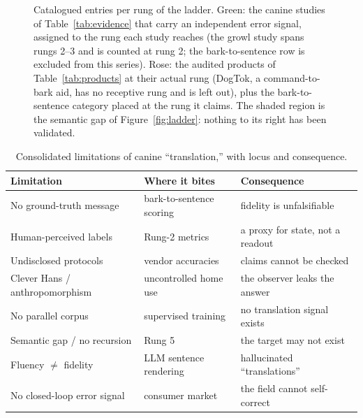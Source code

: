 \begin{figure}[htbp]
\centering
\resizebox{0.94\textwidth}{!}{}
\caption{Catalogued entries per rung of the ladder. Green: the canine studies
of Table~\ref{tab:evidence} that carry an independent error signal, assigned
to the rung each study reaches (the growl study spans rungs 2--3 and is
counted at rung 2; the bark-to-sentence row is excluded from this series).
Rose: the audited products of Table~\ref{tab:products} at their actual rung
(DogTok, a command-to-bark aid, has no receptive rung and is left out), plus
the bark-to-sentence category placed at the rung it claims. The shaded
region is the semantic gap of Figure~\ref{fig:ladder}: nothing to its right
has been validated.}
\label{fig:evidence}
\end{figure}

\begin{table}[htbp]
\centering
\caption{Consolidated limitations of canine ``translation,'' with locus and
consequence.}
\label{tab:limits}
\footnotesize
\setlength{\tabcolsep}{4pt}
\begin{tabular}{@{}p{4.0cm}p{4.6cm}p{5.0cm}@{}}
\toprule
\textbf{Limitation} & \textbf{Where it bites} & \textbf{Consequence} \\
\midrule
No ground-truth message & bark-to-sentence scoring & fidelity is unfalsifiable \\
Human-perceived labels & Rung-2 metrics & a proxy for state, not a readout \\
Undisclosed protocols & vendor accuracies & claims cannot be checked \\
Clever Hans / anthropomorphism & uncontrolled home use & the observer leaks the answer \\
No parallel corpus & supervised training & no translation signal exists \\
Semantic gap / no recursion & Rung 5 & the target may not exist \\
Fluency $\neq$ fidelity & LLM sentence rendering & hallucinated ``translations'' \\
No closed-loop error signal & consumer market & the field cannot self-correct \\
\bottomrule
\end{tabular}
\end{table}
